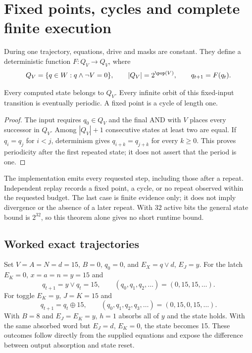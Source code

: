 \section{Fixed points, cycles and complete finite execution}
During one trajectory, equations, drive and masks are constant. They define a
deterministic function $F:Q_V\to Q_V$, where
\begin{equation}
Q_V=\{q\in W:q\land\neg V=0\},\qquad |Q_V|=2^{\pop(V)},\qquad
q_{t+1}=F(q_t).
\end{equation}
\begin{proposition}
Every computed state belongs to $Q_V$. Every infinite orbit of this fixed-input
transition is eventually periodic. A fixed point is a cycle of length one.
\end{proposition}
\begin{proof}
The input requires $q_0\in Q_V$ and the final AND with $V$ places every successor
in $Q_V$. Among $|Q_V|+1$ consecutive states at least two are equal. If
$q_i=q_j$ for $i<j$, determinism gives $q_{i+k}=q_{j+k}$ for every $k\ge0$.
This proves periodicity after the first repeated state; it does not assert
that the period is one.
\end{proof}
The implementation emits every requested step, including those after a repeat.
Independent replay records a fixed point, a cycle, or no repeat observed within
the requested budget. The last case is finite evidence only; it does not imply
divergence or the absence of a later repeat. With 32 active bits the general
state bound is $2^{32}$, so this theorem alone gives no short runtime bound.

\subsection{Worked exact trajectories}
Set $V=A=N=d=15$, $B=0$, $q_0=0$, and $E_X=q\lor d$, $E_J=y$.
For the latch $E_K=0$, $x=a=n=y=15$ and
\begin{equation}
q_{t+1}=y\lor q_t=15,\qquad (q_0,q_1,q_2,\ldots)=(0,15,15,\ldots).
\end{equation}
For toggle $E_K=y$, $J=K=15$ and
\begin{equation}
q_{t+1}=q_t\mathbin{\oplus}15,\qquad
(q_0,q_1,q_2,q_3,\ldots)=(0,15,0,15,\ldots).
\end{equation}
With $B=8$ and $E_J=E_K=y$, $h=1$ absorbs all of $y$ and the state holds.
With the same absorbed word but $E_J=d$, $E_K=0$, the state becomes 15.
These outcomes follow directly from the supplied equations and expose the
difference between output absorption and state reset.

